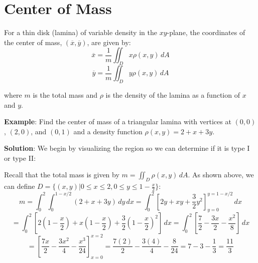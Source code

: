 \section{Center of Mass}
For a thin disk (lamina) of variable density in the $xy$-plane, the coordinates
of the center of mass, $(\overline{x}, \overline{y})$, are given by:
$$\overline{x} = \frac{1}{m} \iint_{\textit{D}} x \rho (x, y)\,dA$$
$$\overline{y} = \frac{1}{m} \iint_{\textit{D}} y \rho (x, y)\,dA$$

where $m$ is the total mass and $\rho$ is the density of the lamina as a 
function of $x$ and $y$. 

\textbf{Example}: Find the center of mass of a triangular lamina with vertices 
at $(0, 0)$, $(2, 0)$, and $(0, 1)$ and a density function $\rho (x, y) = 2 + 
x + 3y$. 

\textbf{Solution}: We begin by visualizing the region so we can determine if 
it is type I or type II:

Recall that the total mass is given by $m = \iint_{\textit{D}} \rho (x, y)
\,dA$. As shown above, we can define $\textit{D} = \{ \left( x, y \right) | 0 
\leq x \leq 2, 0 \leq y \leq 1 - \frac{x}{2} \}$:
$$m = \int_{0}^{2} \int_{0}^{1 - x/2} \left( 2 + x + 3y \right) \,dy \,dx = 
\int_{0}^2 \left[2y + xy + \frac{3}{2}y^2 \right]_{y = 0}^{y = 1 - x/2}\,dx$$
$$= \int_0^2 \left[ 2(1 - \frac{x}{2}) + x(1 - \frac{x}{2}) + \frac{3}{2} (1 - 
\frac{x}{2})^2 \right]\,dx = \int_0^2 \left[ \frac{7}{2} - \frac{3x}{2} - 
\frac{x^2}{8} \right]\,dx$$
$$= \left[ \frac{7x}{2} - \frac{3x^2}{4} - \frac{x^3}{24} \right]_{x = 0}^{x = 
2} = \frac{7(2)}{2} - \frac{3(4)}{4} - \frac{8}{24} = 7 - 3 - \frac{1}{3} = 
\frac{11}{3}$$


